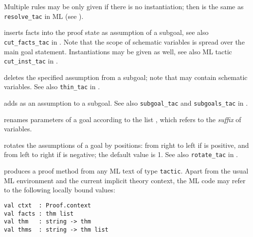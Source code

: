 \begin{isabellebody}
\begin{isamarkuptext}
\begin{descr}
  Multiple rules may be only given if there is no instantiation; then
  \mbox{} is the same as \verb|resolve_tac| in ML (see
  \cite[\S3]{isabelle-ref}).

  \item [\mbox{\isa{cut{\isacharunderscore}tac}}] inserts facts into the proof state as
  assumption of a subgoal, see also \verb|cut_facts_tac| in
  \cite[\S3]{isabelle-ref}.  Note that the scope of schematic
  variables is spread over the main goal statement.  Instantiations
  may be given as well, see also ML tactic \verb|cut_inst_tac| in
  \cite[\S3]{isabelle-ref}.

  \item [\mbox{\isa{thin{\isacharunderscore}tac}}~\isa{{\isasymphi}}] deletes the specified
  assumption from a subgoal; note that \isa{{\isasymphi}} may contain schematic
  variables.  See also \verb|thin_tac| in \cite[\S3]{isabelle-ref}.

  \item [\mbox{\isa{subgoal{\isacharunderscore}tac}}~\isa{{\isasymphi}}] adds \isa{{\isasymphi}} as an
  assumption to a subgoal.  See also \verb|subgoal_tac| and \verb|subgoals_tac| in \cite[\S3]{isabelle-ref}.

  \item [\mbox{\isa{rename{\isacharunderscore}tac}}~\isa{x\isactrlsub {\isadigit{1}}\ {\isasymdots}\ x\isactrlsub n}] renames
  parameters of a goal according to the list , which refers to the \emph{suffix} of variables.

  \item [\mbox{\isa{rotate{\isacharunderscore}tac}}~\isa{n}] rotates the assumptions of a
  goal by  positions: from right to left if  is
  positive, and from left to right if  is negative; the
  default value is 1.  See also \verb|rotate_tac| in
  \cite[\S3]{isabelle-ref}.

  \item [\mbox{\isa{tactic}}~\isa{text}] produces a proof method from
  any ML text of type \verb|tactic|.  Apart from the usual ML
  environment and the current implicit theory context, the ML code may
  refer to the following locally bound values:

{\footnotesize\begin{verbatim}
val ctxt  : Proof.context
val facts : thm list
val thm   : string -> thm
val thms  : string -> thm list
\end{verbatim}}


\end{descr}
\end{isamarkuptext}
\end{isabellebody}

